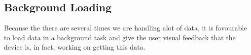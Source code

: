 \subsection{Background Loading}

Because the there are several times we are handling alot of data, it is favourable to load data in a background task and give the user visual feedback that the device is,  in fact, working on getting this data.